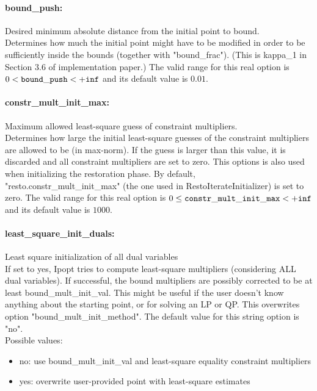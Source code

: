 \paragraph{bound\_push:}\label{opt:bound_push} Desired minimum absolute distance from the initial point to bound. \\
 Determines how much the initial point might have to be modified in order to be sufficiently inside the bounds (together with "bound\_frac").  (This is kappa\_1 in Section 3.6 of implementation paper.) The valid range for this real option is 
$0 <  {\tt bound\_push } <  {\tt +inf}$
and its default value is $0.01$.


\paragraph{constr\_mult\_init\_max:}\label{opt:constr_mult_init_max} Maximum allowed least-square guess of constraint multipliers. \\
 Determines how large the initial least-square guesses of the constraint multipliers are allowed to be (in max-norm). If the guess is larger than this value, it is discarded and all constraint multipliers are set to zero.  This options is also used when initializing the restoration phase. By default, "resto.constr\_mult\_init\_max" (the one used in RestoIterateInitializer) is set to zero. The valid range for this real option is 
$0 \le {\tt constr\_mult\_init\_max } <  {\tt +inf}$
and its default value is $1000$.


\paragraph{least\_square\_init\_duals:}\label{opt:least_square_init_duals} Least square initialization of all dual variables \\
 If set to yes, Ipopt tries to compute least-square multipliers (considering ALL dual variables).  If successful, the bound multipliers are possibly corrected to be at least bound\_mult\_init\_val. This might be useful if the user doesn't know anything about the starting point, or for solving an LP or QP.  This overwrites option "bound\_mult\_init\_method". The default value for this string option is "no".
\\ 
Possible values:
\begin{itemize}
   \item no: use bound\_mult\_init\_val and least-square equality constraint multipliers
   \item yes: overwrite user-provided point with least-square estimates
\end{itemize}

